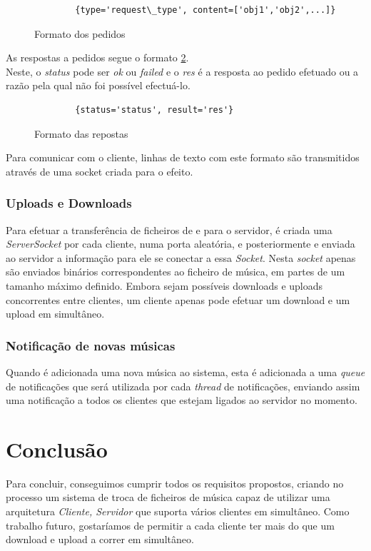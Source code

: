 \documentclass[a4paper]{report}
\begin{document}
\begin{figure}[H]
    \begin{verbatim}
        {type='request\_type', content=['obj1','obj2',...]}
    \end{verbatim}
    \caption{Formato dos pedidos}
    \label{inputformat}
\end{figure}
As respostas a pedidos segue o formato \ref{outputformat}.\\
Neste, o \textit{status} pode ser \textit{ok} ou \textit{failed} e o
\textit{res} é a resposta ao pedido efetuado ou a razão pela qual não foi
possível  efectuá-lo.

\begin{figure}[H]
    \begin{verbatim}
        {status='status', result='res'}
    \end{verbatim}
    \caption{Formato das repostas}
    \label{outputformat}
\end{figure}
Para comunicar com o cliente, linhas de texto com este formato são transmitidos
através de uma socket criada para o efeito.

\subsection{Uploads e Downloads}
Para efetuar a transferência de ficheiros de e para o servidor, é criada uma
\textit{ServerSocket} por cada cliente, numa porta aleatória, e posteriormente
e enviada ao servidor a informação para ele se conectar a essa \textit{Socket}.
Nesta \textit{socket} apenas são enviados binários correspondentes ao ficheiro
de música, em partes de um tamanho máximo definido. Embora sejam possíveis
downloads e uploads concorrentes entre clientes, um cliente apenas pode efetuar
um download e um upload em simultâneo.

\subsection{Notificação de novas músicas}
Quando é adicionada uma nova música ao sistema, esta é adicionada a uma
\textit{queue} de notificações que será utilizada por cada \textit{thread} de
notificações, enviando assim uma notificação a todos os clientes que estejam
ligados ao servidor no momento.

\chapter{Conclusão}
Para concluir, conseguimos cumprir todos os requisitos propostos, criando no processo um
sistema de troca de ficheiros de música capaz de utilizar uma arquitetura 
\textit{Cliente, Servidor} que suporta vários clientes em simultâneo.
Como trabalho futuro, gostaríamos de permitir a cada cliente ter mais do que um
download e upload a correr em simultâneo.
\end{document}
